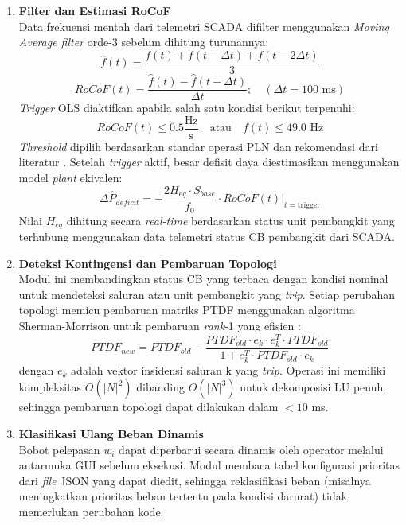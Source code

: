 \begin{enumerate}
\item[a.] \textbf{Filter dan Estimasi RoCoF} \\
Data frekuensi mentah dari telemetri SCADA difilter menggunakan \textit{Moving Average filter} orde-3 sebelum dihitung turunannya:
\begin{equation}
    \hat{f}(t) = \frac{f(t) + f(t-\Delta t) + f(t-2\Delta t)}{3}
\end{equation}
\begin{equation}
    RoCoF(t) = \frac{\hat{f}(t) - \hat{f}(t-\Delta t)}{\Delta t}; \quad (\Delta t = 100 \text{ ms})
\end{equation}
\textit{Trigger} OLS diaktifkan apabila salah satu kondisi berikut terpenuhi:
\begin{equation}
    RoCoF(t) \le 0.5 \frac{\text{Hz}}{\text{s}} \quad \text{atau} \quad f(t) \le 49.0 \text{ Hz}
\end{equation}
\textit{Threshold} dipilih berdasarkan standar operasi PLN dan rekomendasi dari literatur \cite{Parniani2006, PermenESDM2007}. Setelah \textit{trigger} aktif, besar defisit daya diestimasikan menggunakan model \textit{plant} ekivalen:
\begin{equation}
    \Delta\hat{P}_{deficit} = -\frac{2H_{eq}\cdot S_{base}}{f_{0}} \cdot RoCoF(t)\big|_{t=\text{trigger}}
\end{equation}
Nilai $H_{eq}$ dihitung secara \textit{real-time} berdasarkan status unit pembangkit yang terhubung menggunakan data telemetri status CB pembangkit dari SCADA.

\item[b.] \textbf{Deteksi Kontingensi dan Pembaruan Topologi} \\
Modul ini membandingkan status CB yang terbaca dengan kondisi nominal untuk mendeteksi saluran atau unit pembangkit yang \textit{trip}. Setiap perubahan topologi memicu pembaruan matriks PTDF menggunakan algoritma Sherman-Morrison untuk pembaruan \textit{rank}-1 yang efisien \cite{Golub2013}:
\begin{equation}
    PTDF_{new} = PTDF_{old} - \frac{PTDF_{old} \cdot e_{k} \cdot e_{k}^{T} \cdot PTDF_{old}}{1 + e_{k}^{T} \cdot PTDF_{old} \cdot e_{k}}
\end{equation}
dengan $e_{k}$ adalah vektor insidensi saluran k yang \textit{trip}. Operasi ini memiliki kompleksitas $O(|N|^{2})$ dibanding $O(|N|^{3})$ untuk dekomposisi LU penuh, sehingga pembaruan topologi dapat dilakukan dalam $< 10$ ms.

\item[c.] \textbf{Klasifikasi Ulang Beban Dinamis} \\
Bobot pelepasan $w_{i}$ dapat diperbarui secara dinamis oleh operator melalui antarmuka GUI sebelum eksekusi. Modul membaca tabel konfigurasi prioritas dari \textit{file} JSON yang dapat diedit, sehingga reklasifikasi beban (misalnya meningkatkan prioritas beban tertentu pada kondisi darurat) tidak memerlukan perubahan kode.
\end{enumerate}

